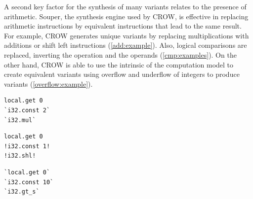 A second key factor for the synthesis of many variants relates to the presence of arithmetic. Souper, the synthesis engine used by CROW, is effective in replacing  arithmetic instructions by equivalent instructions that lead to the same result. For example, CROW generates unique variants by replacing multiplications with additions or shift left instructions (\autoref{add:example}). Also, logical comparisons are replaced, inverting the operation and the operands (\autoref{cmp:examples}). On the other hand, CROW is able to use the intrinsic of the computation model to create equivalent variants using overflow and underflow of integers to produce variants (\autoref{overflow:example}).


\begin{code}
    \scriptsize

    \lstset{
        language=WAT,
        style=nccode,
        basicstyle=\footnotesize\ttfamily,
        columns=fullflexible,
        breaklines=true
    }
    \noindent\begin{minipage}[b]{0.32\linewidth}
        \label{add:example}
        \noindent\begin{minipage}[t]{0.46\linewidth}
            \begin{lstlisting}
local.get 0
`i32.const 2`
`i32.mul`
            \end{lstlisting}
        \end{minipage}%
        \hfill\noindent\begin{minipage}[t]{0.46\linewidth}
            
            \begin{lstlisting}
local.get 0
!i32.const 1!
!i32.shl!
            \end{lstlisting}
        \end{minipage}
    \end{minipage}\hfill%
    \begin{minipage}[b]{0.31\linewidth}
        \label{cmp:examples}
        \begin{minipage}[t]{.46\linewidth}
            \begin{lstlisting}
`local.get 0`
`i32.const 10`
`i32.gt_s`
            \end{lstlisting}
        \end{minipage}\hfill\begin{minipage}[t]{.46\linewidth}
           

\end{minipage}
\end{minipage}
\end{code}

